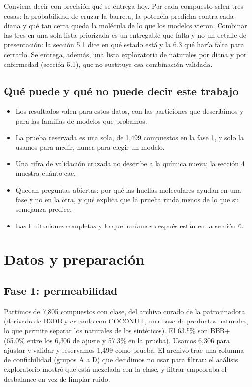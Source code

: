 \documentclass[letterpaper,11pt]{article}
\providecommand{\tightlist}{\setlength{\itemsep}{0pt}\setlength{\parskip}{0pt}}
\begin{document}
Conviene decir con precisión qué se entrega hoy. Por cada compuesto salen tres cosas: la probabilidad de cruzar la barrera, la potencia predicha contra cada diana y qué tan cerca queda la molécula de lo que los modelos vieron. Combinar las tres en una sola lista priorizada es un entregable que falta y no un detalle de presentación: la sección 5.1 dice en qué estado está y la 6.3 qué haría falta para cerrarlo. Se entrega, además, una lista exploratoria de naturales por diana y por enfermedad (sección 5.1), que no sustituye esa combinación validada.

\subsection{Qué puede y qué no puede decir este trabajo}

\begin{itemize}
\tightlist
\item
  Los resultados valen para estos datos, con las particiones que describimos y para las familias de modelos que probamos.
\item
  La prueba reservada es una sola, de 1,499 compuestos en la fase 1, y solo la usamos para medir, nunca para elegir un modelo.
\item
  Una cifra de validación cruzada no describe a la química nueva; la sección 4 muestra cuánto cae.
\item
  Quedan preguntas abiertas: por qué las huellas moleculares ayudan en una fase y no en la otra, y qué explica que la prueba rinda menos de lo que su semejanza predice.
\item
  Las limitaciones completas y lo que haríamos después están en la sección 6.
\end{itemize}

\section{Datos y preparación}
\subsection{Fase 1: permeabilidad}

Partimos de 7,805 compuestos con clase, del archivo curado de la patrocinadora (derivado de B3DB y cruzado con COCONUT, una base de productos naturales, lo que permite separar los naturales de los sintéticos). El 63.5\% son BBB+ (65.0\% entre los 6,306 de ajuste y 57.3\% en la prueba). Usamos 6,306 para ajustar y validar y reservamos 1,499 como prueba. El archivo trae una columna de confiabilidad (grupos A a D) que decidimos no usar para filtrar: el análisis exploratorio mostró que está mezclada con la clase, y filtrar empeoraba el desbalance en vez de limpiar ruido.
\end{document}
